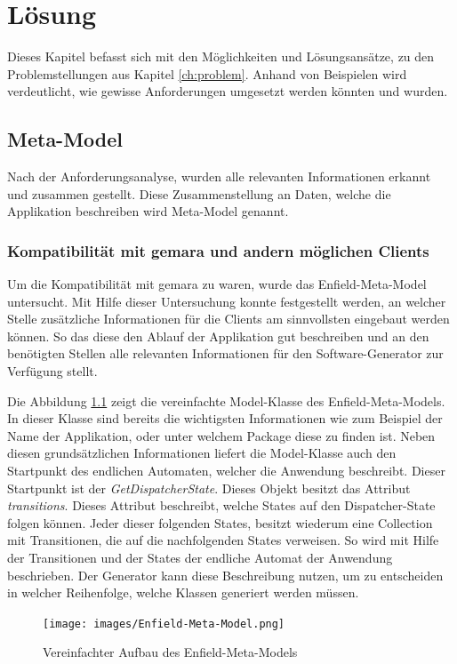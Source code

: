 \chapter{Lösung}
Dieses Kapitel befasst sich mit den Möglichkeiten und Lösungsansätze, zu den Problemstellungen aus Kapitel \ref{ch:problem}. Anhand von Beispielen wird verdeutlicht, wie gewisse Anforderungen umgesetzt werden könnten und wurden.

\section{Meta-Model}
Nach der Anforderungsanalyse, wurden alle relevanten Informationen erkannt und zusammen gestellt. Diese Zusammenstellung an Daten, welche die Applikation beschreiben wird Meta-Model genannt.

\subsection{Kompatibilität mit \acs{gemara} und andern möglichen Clients}

Um die Kompatibilität mit \acf{gemara} zu waren, wurde das Enfield-Meta-Model untersucht. Mit Hilfe dieser Untersuchung konnte festgestellt werden, an welcher Stelle zusätzliche Informationen für die Clients am sinnvollsten eingebaut werden können. So das diese den Ablauf der Applikation gut beschreiben und an den benötigten Stellen alle relevanten Informationen für den Software-Generator zur Verfügung stellt.

Die Abbildung \ref{fig:enfield-model} zeigt die vereinfachte Model-Klasse des Enfield-Meta-Models. 
In dieser Klasse sind bereits die wichtigsten Informationen wie zum Beispiel der Name der Applikation, oder unter welchem Package diese zu finden ist. Neben diesen grundsätzlichen Informationen liefert die Model-Klasse auch den Startpunkt des endlichen Automaten, welcher die Anwendung beschreibt. Dieser Startpunkt ist der \textit{GetDispatcherState}. Dieses Objekt besitzt das Attribut \textit{transitions}. Dieses Attribut beschreibt, welche States auf den Dispatcher-State folgen können. Jeder dieser folgenden States, besitzt wiederum eine Collection mit Transitionen, die auf die nachfolgenden States verweisen. So wird mit Hilfe der Transitionen und der States der endliche Automat der Anwendung beschrieben. Der Generator kann diese Beschreibung nutzen, um zu entscheiden in welcher Reihenfolge, welche Klassen generiert werden müssen.

\begin{figure}[H]
	\begin{center}
		\texttt{[image: images/Enfield-Meta-Model.png]}
		\caption{Vereinfachter Aufbau des Enfield-Meta-Models}
		\label{fig:enfield-model}
	\end{center}
\end{figure}

